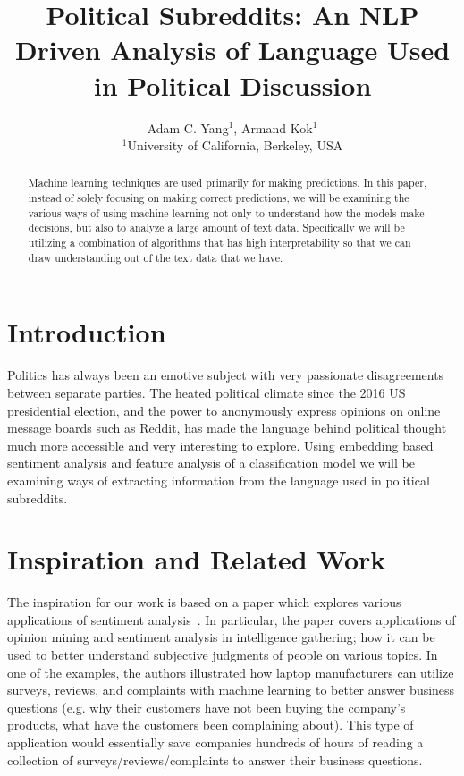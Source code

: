 \documentclass[conference]{IEEEtran}
\begin{document}
\title{Political Subreddits: An NLP Driven Analysis of Language Used in Political Discussion}

\author{
Adam C. Yang$^1$,
Armand Kok$^1$\\
%
$^1$University of California, Berkeley, USA
}

\maketitle

\begin{abstract}
Machine learning techniques are used primarily for making predictions. In this paper, instead of solely focusing on making correct predictions, we will be examining the various ways of using machine learning not only to understand how the models make decisions, but also to analyze a large amount of text data. Specifically we will be utilizing a combination of algorithms that has high interpretability so that we can draw understanding out of the text data that we have.
\end{abstract}

\section{Introduction}
Politics has always been an emotive subject with very passionate disagreements between separate parties. The heated political climate since the 2016 US presidential election, and the power to anonymously express opinions on online message boards such as Reddit, has made the language behind political thought much more accessible and very interesting to explore. Using embedding based sentiment analysis and feature analysis of a classification model we will be examining ways of extracting information from the language used in political subreddits.

\section{Inspiration and Related Work}
The inspiration for our work is based on a paper which explores various applications of sentiment analysis~\cite{pang2008opinion}. In particular, the paper covers applications of opinion mining and sentiment analysis in intelligence gathering; how it can be used to better understand subjective judgments of people on various topics. In one of the examples, the authors illustrated how laptop manufacturers can utilize surveys, reviews, and complaints with machine learning to better answer business questions (e.g. why their customers have not been buying the company's products, what have the customers been complaining about). This type of application would essentially save companies hundreds of hours of reading a collection of surveys/reviews/complaints to answer their business questions.
\end{document}
